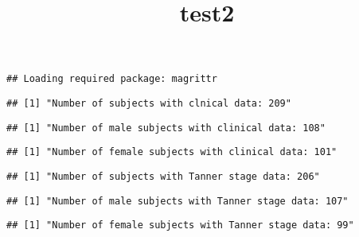 \documentclass[]{article}
\title{test2}
\author{}
\date{}
\begin{document}
\maketitle

\begin{verbatim}
## Loading required package: magrittr
\end{verbatim}

\begin{verbatim}
## [1] "Number of subjects with clnical data: 209"
\end{verbatim}

\begin{verbatim}
## [1] "Number of male subjects with clinical data: 108"
\end{verbatim}

\begin{verbatim}
## [1] "Number of female subjects with clinical data: 101"
\end{verbatim}

\begin{verbatim}
## [1] "Number of subjects with Tanner stage data: 206"
\end{verbatim}

\begin{verbatim}
## [1] "Number of male subjects with Tanner stage data: 107"
\end{verbatim}

\begin{verbatim}
## [1] "Number of female subjects with Tanner stage data: 99"
\end{verbatim}
\end{document}
